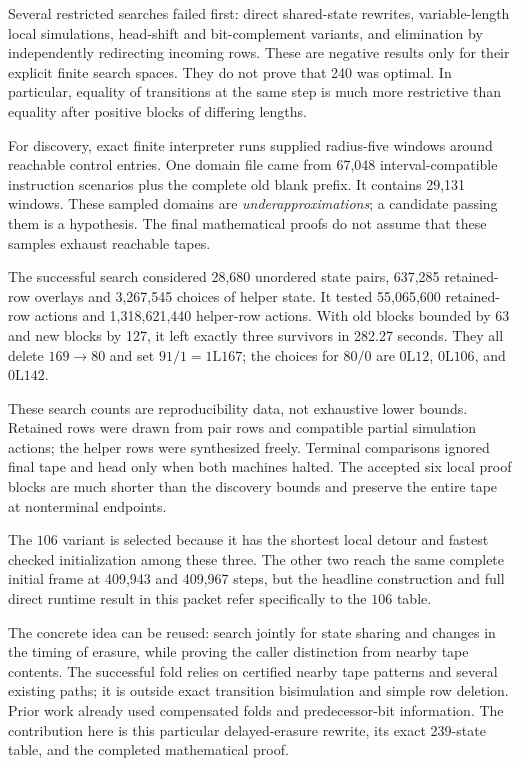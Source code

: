 \documentclass[11pt,a4paper]{article}
\begin{document}
Several restricted searches failed first: direct shared-state rewrites,
variable-length local simulations, head-shift and bit-complement variants,
and elimination by independently redirecting incoming rows. These are
negative results only for their explicit finite search spaces. They do
not prove that 240 was optimal. In particular, equality of transitions
at the same step is much more restrictive than equality after positive
blocks of differing lengths.

For discovery, exact finite interpreter runs supplied radius-five windows
around reachable control entries. One domain file came from 67,048
interval-compatible instruction scenarios plus the complete old blank
prefix. It contains 29,131 windows. These sampled domains are
\emph{underapproximations}; a candidate passing them is a hypothesis.
The final mathematical proofs do not assume that these samples exhaust
reachable tapes.

The successful search considered 28,680 unordered state pairs, 637,285
retained-row overlays and 3,267,545 choices of helper state. It tested
55,065,600 retained-row actions and 1,318,621,440 helper-row actions.
With old blocks bounded by 63 and new blocks by 127, it left exactly
three survivors in 282.27 seconds. They all delete $169\to80$ and set
$91/1=1\mathrm L167$; the choices for $80/0$ are $0\mathrm L12$,
$0\mathrm L106$, and $0\mathrm L142$.

These search counts are reproducibility data, not exhaustive lower
bounds. Retained rows were drawn from pair rows and compatible partial
simulation actions; the helper rows were synthesized freely. Terminal
comparisons ignored final tape and head only when both machines halted.
The accepted six local proof blocks are much shorter than the discovery
bounds and preserve the entire tape at nonterminal endpoints.

The $106$ variant is selected because it has the shortest local detour
and fastest checked initialization among these three. The other two
reach the same complete initial frame at 409,943 and 409,967 steps, but
the headline construction and full direct runtime result in this packet
refer specifically to the $106$ table.

The concrete idea can be reused: search jointly for state sharing and
changes in the timing of erasure, while proving the caller distinction
from nearby tape contents. The successful fold relies on certified nearby tape
patterns and several existing paths; it is outside exact transition
bisimulation and simple row deletion. Prior work already used compensated
folds and predecessor-bit information. The contribution here is this
particular delayed-erasure rewrite, its exact 239-state table, and the
completed mathematical proof.
\end{document}

